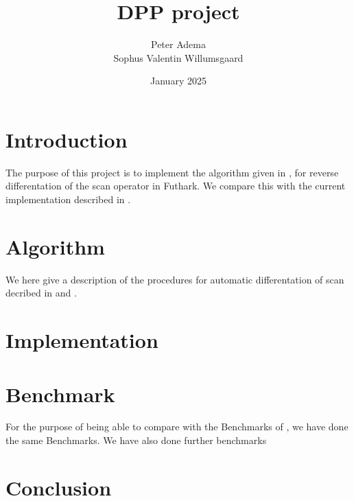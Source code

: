\documentclass{article}
\title{DPP project}
\author{Peter Adema \\
Sophus Valentin Willumsgaard}
\date{January 2025}
\begin{document}
\maketitle

\section{Introduction}
The purpose of this project is to implement the algorithm given in \cite{PPAD}, for reverse
differentation of the scan operator in Futhark.
We compare this with the current implementation described in \cite{Futhark}.
\section{Algorithm}
We here give a description of the procedures for automatic differentation of
scan decribed in \cite{PPAD} and \cite{Futhark}.
\section{Implementation}
\section{Benchmark}
For the purpose of being able to compare with the Benchmarks of
\cite{Futhark}, we have done the same Benchmarks. We have also done further
benchmarks
\section{Conclusion}

\printbibliography
\end{document}
